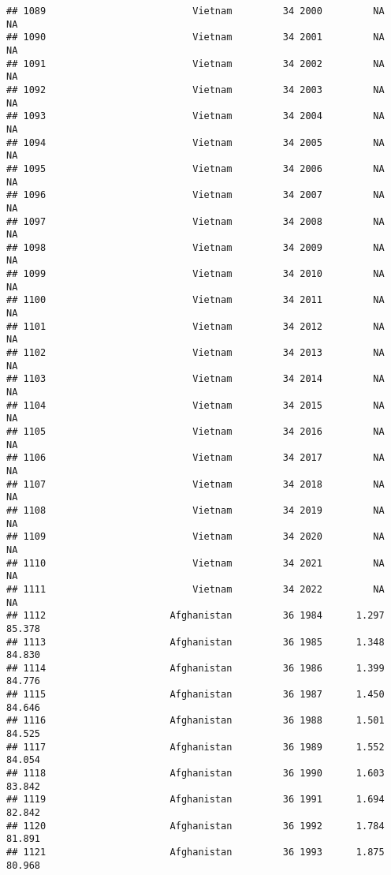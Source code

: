 \documentclass[
]{article}
\begin{document}
\begin{verbatim}
## 1089                          Vietnam         34 2000         NA         NA
## 1090                          Vietnam         34 2001         NA         NA
## 1091                          Vietnam         34 2002         NA         NA
## 1092                          Vietnam         34 2003         NA         NA
## 1093                          Vietnam         34 2004         NA         NA
## 1094                          Vietnam         34 2005         NA         NA
## 1095                          Vietnam         34 2006         NA         NA
## 1096                          Vietnam         34 2007         NA         NA
## 1097                          Vietnam         34 2008         NA         NA
## 1098                          Vietnam         34 2009         NA         NA
## 1099                          Vietnam         34 2010         NA         NA
## 1100                          Vietnam         34 2011         NA         NA
## 1101                          Vietnam         34 2012         NA         NA
## 1102                          Vietnam         34 2013         NA         NA
## 1103                          Vietnam         34 2014         NA         NA
## 1104                          Vietnam         34 2015         NA         NA
## 1105                          Vietnam         34 2016         NA         NA
## 1106                          Vietnam         34 2017         NA         NA
## 1107                          Vietnam         34 2018         NA         NA
## 1108                          Vietnam         34 2019         NA         NA
## 1109                          Vietnam         34 2020         NA         NA
## 1110                          Vietnam         34 2021         NA         NA
## 1111                          Vietnam         34 2022         NA         NA
## 1112                      Afghanistan         36 1984      1.297     85.378
## 1113                      Afghanistan         36 1985      1.348     84.830
## 1114                      Afghanistan         36 1986      1.399     84.776
## 1115                      Afghanistan         36 1987      1.450     84.646
## 1116                      Afghanistan         36 1988      1.501     84.525
## 1117                      Afghanistan         36 1989      1.552     84.054
## 1118                      Afghanistan         36 1990      1.603     83.842
## 1119                      Afghanistan         36 1991      1.694     82.842
## 1120                      Afghanistan         36 1992      1.784     81.891
## 1121                      Afghanistan         36 1993      1.875     80.968

\end{verbatim}
\end{document}
